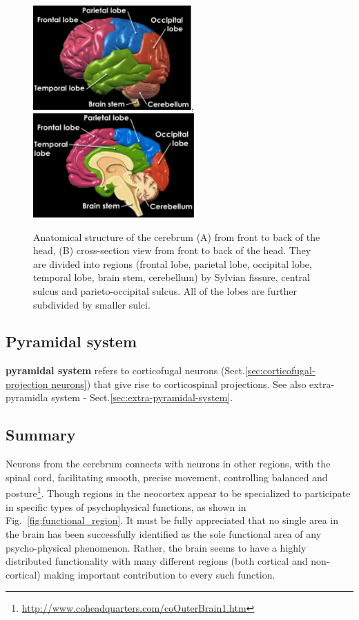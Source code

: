 \begin{figure}[hbt]
  \centerline{\includegraphics[height=4cm,
    angle=0]{./images/brain_02.eps},\includegraphics[height=4cm,
    angle=0]{./images/brain_03.eps}}
  \caption{Anatomical structure of the cerebrum (A) from front to back of the
  head, (B) cross-section view from front to back of the head. They are divided
  into regions (frontal lobe, parietal lobe, occipital lobe, temporal lobe,
  brain stem, cerebellum) by Sylvian fissure, central sulcus
    and parieto-occipital sulcus. All of the lobes are further subdivided by
    smaller sulci. }
\label{fig:cerebrum_lobes}
\end{figure}



\subsection{Pyramidal system}
\label{sec:pyramidal-system}

{\bf pyramidal system} refers to corticofugal neurons
(Sect.\ref{sec:corticofugal-projection neurons}) that give rise to corticospinal
projections. See also extra-pyramidla
system - Sect.\ref{sec:extra-pyramidal-system}.

\subsection{Summary}

Neurons from the cerebrum connects with neurons in other regions, with
the spinal cord, facilitating smooth, precise movement, controlling
balanced and
posture\footnote{\url{http://www.coheadquarters.com/coOuterBrain1.htm}}.
Though regions in the neocortex appear to be specialized to
participate in specific types of psychophysical functions, as shown in
Fig.~\ref{fig:functional_region}. It must be fully appreciated that no
single area in the brain has been successfully identified as the sole
functional area of any psycho-physical phenomenon. Rather, the brain
seems to have a highly distributed functionality with many different
regions (both cortical and non-cortical) making important contribution
to every such function.

